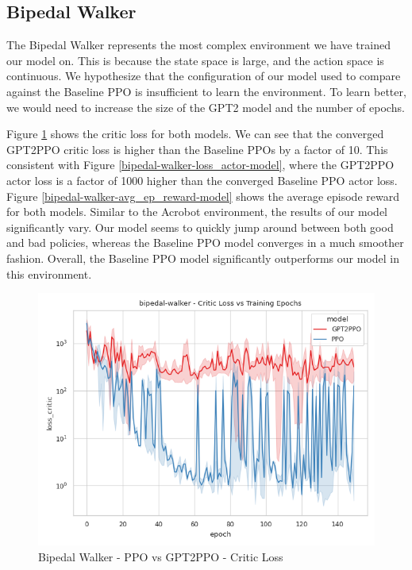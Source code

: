 \subsection{Bipedal Walker}
The Bipedal Walker represents the most complex environment we have trained our model on. This is because the state space is large, and
the action space is continuous. We hypothesize that the configuration of our model used to compare against the Baseline PPO is
insufficient to learn the environment. To learn better, we would need to increase the size of the GPT2 model and the number of epochs.

Figure \ref{bipedal-walker-loss_critic-model} shows the critic loss for both models. We can see that the converged GPT2PPO critic loss is higher
than the Baseline PPOs by a factor of 10. This consistent with Figure \ref{bipedal-walker-loss_actor-model}, where the GPT2PPO actor loss is a factor of 1000
higher than the converged Baseline PPO actor loss.
Figure \ref{bipedal-walker-avg_ep_reward-model} shows the average episode reward for both models. Similar to the Acrobot environment,
the results of our model significantly vary. Our model seems to quickly jump around between both good and bad policies, whereas the Baseline PPO model
converges in a much smoother fashion.
Overall, the Baseline PPO model significantly outperforms our model in this environment.

\begin{figure}[htbp]
    \centerline{\includegraphics[width=\columnwidth]{./img/bipedal-walker-loss_critic-model.png}}
    \caption{Bipedal Walker - PPO vs GPT2PPO - Critic Loss}
    \label{bipedal-walker-loss_critic-model}
\end{figure}

